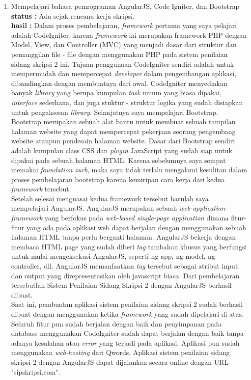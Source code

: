 \documentclass[a4paper,twoside]{article}
\begin{document}
\begin{enumerate}
		\item Mempelajari bahasa pemrograman AngularJS, Code Igniter, dan Bootstrap\\
		{\bf status :} Ada sejak rencana kerja skripsi.\\
		{\bf hasil :} Dalam proses pembelajaran, \textit{framework} pertama yang saya pelajari adalah CodeIgniter, karena \textit{framework} ini merupakan framework PHP dengan Model, View, dan Controller (MVC) yang menjadi dasar dari struktur dan pemanggilan file - file dengan menggunakan PHP pada sistem penilaian sidang skripsi 2 ini. Tujuan penggunaan CodeIgniter sendiri adalah untuk mempermudah dan mempercepat \textit{developer} dalam pengembangan aplikasi, dibandingkan dengan membuatnya dari awal. CodeIgniter menyediakan banyak \textit{library} yang berupa kumpulan \textit{task} umum yang biasa dipakai, \textit{interface} sederhana, dan juga stuktur - struktur logika yang sudah disiapkan untuk pengaksesan \textit{library}.
		\linebreak
		Selanjutnya saya mempelajari Bootstrap. Bootstrap merupakan sebuah alat bantu untuk membuat sebuah tampilan halaman website yang dapat mempercepat pekerjaan seorang pengembang website ataupun pendesain halaman website. Dasar dari Bootstrap sendiri adalah kumpulan class CSS dan \textit{plugin} JavaScript yang sudah siap untuk dipakai pada sebuah halaman HTML. Karena sebelumnya saya sempat memakai \textit{foundation zurb}, maka saya tidak terlalu mengalami kesulitan dalam proses pembelajaran bootstrap karena kemiripan cara kerja dari kedua \textit{framework} tersebut.\\
		\linebreak
		Setelah selesai menguasai kedua framework tersebut barulah saya mempelajari AngularJS. AngularJS merupakan sebuah \textit{web-application-framework} yang berfokus pada \textit{web-based single-page application} dimana fitur-fitur yang ada pada aplikasi web dapat berjalan dengan menggunakan sebuah halaman HTML tanpa perlu berganti halaman. AngularJS bekerja dengan membaca HTML page yang sudah diberi \textit{tag} tambahan khusus yang berfungsi untuk mulai mengeksekusi AngularJS, seperti ng-app, ng-model, ng-controller, dll. AngularJS memanfaatkan \textit{tag} tersebut sebagai atribut input dan output yang direpresentasikan oleh javascript biasa. 
		Dari pembelajaran tersebutlah Sistem Penilaian Sidang Skripsi 2 dengan AngularJS berhasil dibuat.\\
		Saat ini, pembuatan aplikasi sistem penilaian sidang skripsi 2 sudah berhasil dibuat dengan menggunakan ketika \textit{framework} yang sudah dipelajari di atas. Seluruh fitur pun sudah berjalan dengan baik dan penyimpanan pada database menggunakan CodeIgniter sudah dapat berjalan dengan baik tanpa adanya kesalahan atau \textit{error} yang terjadi pada aplikasi. Aplikasi pun sudah menggunakan \textit{web-hosting} dari Qwords. Aplikasi sistem penilaian sidang skripsi 2 dengan AngularJS dapat dijalankan secara online dengan URL "sipskripsi.com".


\end{enumerate}
\end{document}
